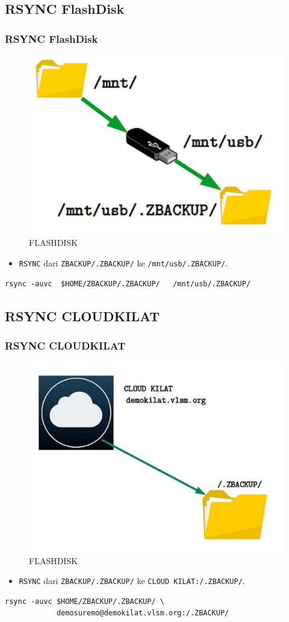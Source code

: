 \documentclass[xcolor=table, notheorems, hyperref={pdfpagelabels=false}]{beamer}
\begin{document}
\begin{frame}[fragile]
\section{RSYNC FlashDisk}
\frametitle{RSYNC FlashDisk}
\begin{figure}
\includegraphics[width=0.61\linewidth]{FLASHDISK}
\caption{FLASHDISK}
\end{figure}
\begin{itemize}
\item \texttt{RSYNC} dari \texttt{ZBACKUP/.ZBACKUP/} ke \texttt{/mnt/usb/.ZBACKUP/}.
\end{itemize}
\begin{lstlisting}[basicstyle=\ttfamily\small]
    rsync -auvc  $HOME/ZBACKUP/.ZBACKUP/   /mnt/usb/.ZBACKUP/
\end{lstlisting}
\end{frame}

\begin{frame}[fragile]
\section{RSYNC CLOUDKILAT}
\frametitle{RSYNC CLOUDKILAT}
\begin{figure}
\includegraphics[width=0.51\linewidth]{CLOUDKILAT}
\caption{FLASHDISK}
\end{figure}
\begin{itemize}
\item \texttt{RSYNC} dari \texttt{ZBACKUP/.ZBACKUP/} ke \texttt{CLOUD KILAT:/.ZBACKUP/}.
\end{itemize}
\begin{lstlisting}[basicstyle=\ttfamily\large]
         rsync -auvc $HOME/ZBACKUP/.ZBACKUP/ \
            demosuremo@demokilat.vlsm.org:/.ZBACKUP/
\end{lstlisting}
\end{frame}
\end{document}

